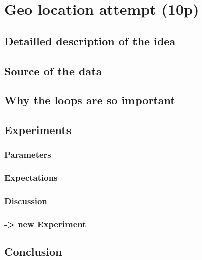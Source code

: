 \documentclass[../Main.tex]{subfiles}
\begin{document}
\section{Geo location attempt (10p)}
\subsection{Detailled description of the idea}
\subsection{Source of the data}
\subsection{Why the loops are so important}
\subsection{Experiments}
\subsubsection{Parameters}
\subsubsection{Expectations}
\subsubsection{Discussion}
\subsubsection{-> new Experiment}
\subsection{Conclusion}
\end{document}
